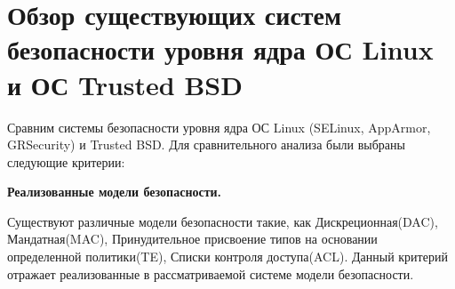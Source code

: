 \begin{comment}
\subsection{Детализация постановки}
Для решения поставленной задачи необходимо решить следующие подзадачи:
\begin{itemize}
\item Рассмотреть возможности платформы Android для динамической 
инструментации кода точками останова. Исследовать существующие
возможности ядра Linux в Android для решения данной задачи в версии для
платформы ARM.
\item Предложить план по портированию системы, описанной в
    работах \cite{sacharov} \cite{bush}, в ОС Android. Сделать
    реализацию
\item Взять модельный пример сервиса, в котором будут явно выделены
    части, связанные с инициализацией ресурсов и обработкой запросов,
    пометить переходы между ними точками останова и показать
    работоспособность предложенного подхода. Все эксперементы достаточно
    проводить на эмуляторе.
\end{itemize}

\subsection{Ожидаемые результаты}
\begin{itemize}
\item Модуль ядра или патч к исходному коду, реализующий контроль
    поведения и переключение контекстов SELinux, желательно с
    минимальными модификациями кода ядра.
\end{itemize}

\end{comment}

\section{Обзор существующих систем безопасности 
    уровня ядра ОС Linux и ОС Trusted BSD}

\bigskip
Сравним системы безопасности уровня ядра ОС Linux
(SELinux, AppArmor, GRSecurity) и Trusted BSD. 
Для сравнительного анализа были выбраны следующие 
критерии:

\bigskip
{\bfseries Реализованные модели безопасности.} 

    Существуют различные модели безопасности такие, 
    как Дискреционная(DAC), Мандатная(MAC), Принудительное 
    присвоение типов на основании определенной 
    политики(TE), Списки контроля доступа(ACL). 
    Данный критерий отражает реализованные 
    в рассматриваемой системе модели безопасности.  

